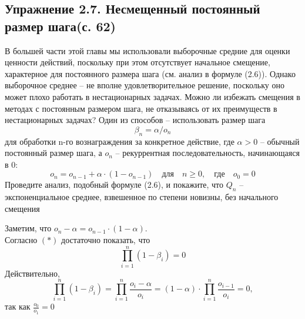 \subsection{Упражнение 2.7. Несмещенный постоянный размер шага(с. 62)}
В  большей части этой главы мы использовали выборочные средние для оценки ценности действий, поскольку при этом отсутствует начальное смещение, характерное для постоянного размера шага (см. анализ в формуле (2.6)). Однако выборочное среднее – не вполне удовлетворительное решение, поскольку оно может плохо работать в нестационарных задачах. Можно ли избежать смещения в  методах с  постоянным размером шага, не отказываясь от их преимуществ в нестационарных задачах?
Один из способов – использовать размер шага
\begin{equation}
\beta_n = \alpha / o_n
\tag{2.8}
\end{equation}
для обработки n-го вознаграждения за конкретное действие, где $\alpha > 0$ – обычный постоянный размер шага, а $o_n$
 – рекуррентная последовательность, начинающаяся в 0:
\begin{equation}
o_n = o_{n-1} + \alpha \cdot (1 - o_{n-1}) \quad \text{для} \quad n\ge0, \quad \text{где} \quad o_0=0
\tag{2.9}
\end{equation}
Проведите анализ, подобный формуле (2.6), и покажите, что $Q_n$
– экспоненциальное среднее, взвешенное по степени новизны, без начального смещения
\begin{solution}
    Заметим, что $o_n - \alpha = o_{n-1} \cdot (1 - \alpha)$.\\
    Согласно $(*)$ достаточно показать, что
    \[\prod_{i=1}^{n} (1-\beta_i) = 0\]
    Действительно, 
    \[\prod_{i=1}^{n} (1-\beta_i) = \prod_{i=1}^{n} \frac{o_i-\alpha}{o_i} = (1-\alpha) \cdot \prod_{i=1}^{n} \frac{o_{i-1}}{o_i} = 0,\]
    так как $\frac{o_{0}}{o_1} = 0$
\end{solution}

